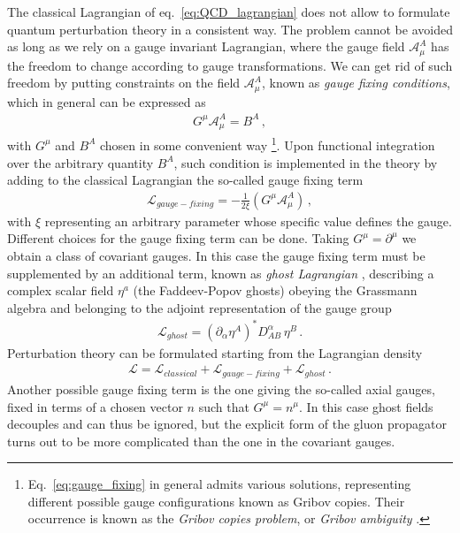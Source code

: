%
The classical Lagrangian of eq.~\eqref{eq:QCD_lagrangian} does not allow to formulate quantum
perturbation theory in a consistent way. The problem cannot be avoided as long as
we rely on a gauge invariant Lagrangian, where the gauge field $\mathcal{A}^A_{\mu}$
has the freedom to change according to gauge transformations.
We can get rid of such freedom by putting constraints on the field $\mathcal{A}^A_{\mu}$, 
known as \textit{gauge fixing conditions}, which in general can be expressed as
\begin{align}
    \label{eq:gauge_fixing}
    G^{\mu}\mathcal{A}_{\mu}^A = B^A\,,
\end{align}
with $G^{\mu}$ and $B^A$ chosen in some convenient way \footnote{Eq.~\eqref{eq:gauge_fixing} in general admits various solutions, representing different possible
gauge configurations known as Gribov copies. Their occurrence is known as the \textit{Gribov copies problem},
or \textit{Gribov ambiguity} \cite{Gribov:1977wm}.}. 
Upon functional integration over the arbitrary quantity $B^A$, such condition is implemented 
in the theory by adding to the classical Lagrangian the so-called gauge fixing term
\begin{align}
    \label{eq:Gauge_fixing_lorents}
    \mathcal{L}_{gauge-fixing} = -\frac{1}{2\xi}\left(G^{\mu}\mathcal{A}_{\mu}^A\right)\,,
\end{align}
with $\xi$ representing an arbitrary parameter whose specific value defines the gauge.
Different choices for the gauge fixing term can be done. Taking $G^{\mu}=\partial^{\mu}$ we obtain
a class of covariant gauges. In this case the gauge fixing term must be supplemented by an additional term,
known as \textit{ghost Lagrangian} \cite{Faddeev:1967fc},
describing a complex scalar field $\eta^a$ (the Faddeev-Popov ghosts) obeying the Grassmann algebra and belonging to the adjoint
representation of the gauge group
\begin{align}
    \label{eq:ghosts_lagrangian}
    \mathcal{L}_{ghost} = \left(\partial_{\alpha}\eta^A\right)^* D^{\alpha}_{AB}\, \eta^B\, .
\end{align}
Perturbation theory can be formulated starting from the Lagrangian density
\begin{align}
    \label{eq:QCD_lagrangian_gauge_fixing}
    \mathcal{L} = \mathcal{L}_{classical} + \mathcal{L}_{gauge-fixing} + \mathcal{L}_{ghost}\, .
\end{align}
Another possible gauge fixing term is the one giving the so-called axial gauges, fixed
in terms of a chosen vector $n$ such that $G^{\mu}=n^{\mu}$. In this case ghost fields decouples
and can thus be ignored, but the explicit form of the gluon propagator turns out to be more complicated than 
the one in the covariant gauges.


